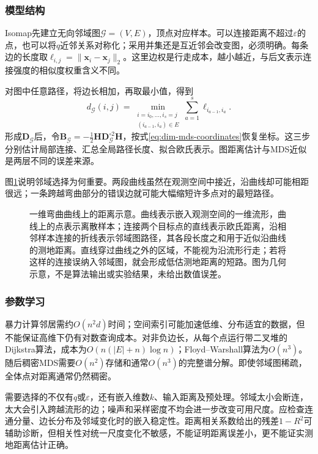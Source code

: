 \subsubsection{模型结构}

Isomap先建立无向邻域图$\mathcal{G}=(V,E)$，顶点对应样本。可以连接距离不超过$\varepsilon$的点，也可以将$q$近邻关系对称化；采用并集还是互近邻会改变图，必须明确。每条边的长度取$\ell_{i,j}=\lVert\bm{x}_i-\bm{x}_j\rVert_2$。这里边权是行走成本，越小越近，与后文表示连接强度的相似度权重含义不同。

对图中任意路径，将边长相加，再取最小值，得到
\begin{equation}
  \label{eq:dim-isomap-distance}
  d_{\mathcal{G}}(i,j)
  =\min_{\substack{i=i_0,\ldots,i_s=j\\(i_{a-1},i_a)\in E}}
    \sum_{a=1}^{s}\ell_{i_{a-1},i_a}.
\end{equation}
形成$\bm{D}_{\mathcal{G}}$后，令$\bm{B}_{\mathcal{G}}=-\tfrac12\bm{H}\bm{D}_{\mathcal{G}}^{\circ2}\bm{H}$，按式\eqref{eq:dim-mds-coordinates}恢复坐标。这三步分别估计局部连接、汇总全局路径长度、拟合欧氏表示。图距离估计与MDS近似是两层不同的误差来源。

图\ref{fig:dim-geodesic}说明邻域选择为何重要。两段曲线虽然在观测空间中接近，沿曲线却可能相距很远；一条跨越弯曲部分的错误边就可能大幅缩短许多点对的最短路径。
\begin{figure}[htbp]
  \centering
  
  \caption{一维弯曲曲线上的距离示意。曲线表示嵌入观测空间的一维流形，曲线上的点表示离散样本；连接两个目标点的直线表示欧氏距离，沿相邻样本连接的折线表示邻域图路径，其各段长度之和用于近似沿曲线的测地距离。直线穿过曲线之外的区域，不能视为沿流形行走；若将这样的连接误纳入邻域图，就会形成低估测地距离的短路。图为几何示意，不是算法输出或实验结果，未给出数值误差。}
  \label{fig:dim-geodesic}
\end{figure}

\subsubsection{参数学习}

暴力计算邻居需约$O(n^2d)$时间；空间索引可能加速低维、分布适宜的数据，但不能保证高维下仍有对数查询成本。对非负边长，从每个点运行带二叉堆的Dijkstra算法，成本为$O(n(|E|+n)\log n)$；Floyd--Warshall算法为$O(n^3)$。随后稠密MDS需要$O(n^2)$存储和通常$O(n^3)$的完整谱分解。即使邻域图稀疏，全体点对距离通常仍然稠密。

需要选择的不仅有$q$或$\varepsilon$，还有嵌入维数$k$、输入距离及预处理。邻域太小会断连，太大会引入跨越流形的边；噪声和采样密度不均会进一步改变可用尺度。应检查连通分量、边长分布及邻域变化时的嵌入稳定性。距离相关系数给出的残差$1-R^2$可辅助诊断，但相关性对统一尺度变化不敏感，不能证明距离误差小，更不能证实测地距离估计正确。

